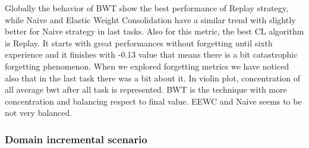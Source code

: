 \documentclass[english, LaM, oneside]{sapthesis}%
\begin{document}
Globally the behavior of BWT show the best performance of Replay strategy, while Naive and Elastic Weight Consolidation have a similar trend with slightly better for Naive strategy in last tasks.
Also for this metric, the best CL algorithm is Replay. It starts with great performances without forgetting until sixth experience and it finishes with -0.13 value that means there is a bit catastrophic forgetting phenomenon. When we explored forgetting metrics we have noticed also that in the last task there was a bit about it.
In violin plot, concentration of all average bwt after all task is represented. BWT is the technique with more concentration and balancing respect to final value. EEWC and Naive seems to be not very balanced.
\subsubsection{Domain incremental scenario}
\end{document}
